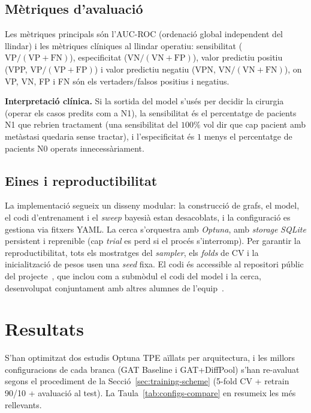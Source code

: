 \documentclass[10pt,a4paper,twocolumn,twoside]{article}
\begin{document}
\subsection{Mètriques d'avaluació}

Les mètriques principals són l'AUC-ROC (ordenació global independent del llindar) i les
mètriques clíniques al llindar operatiu: sensibilitat ($\text{VP}/(\text{VP}+\text{FN})$),
especificitat ($\text{VN}/(\text{VN}+\text{FP})$), valor predictiu positiu
(VPP, $\text{VP}/(\text{VP}+\text{FP})$) i valor predictiu negatiu
(VPN, $\text{VN}/(\text{VN}+\text{FN})$), on VP, VN, FP i FN són els vertaders/falsos positius i
negatius.

\textbf{Interpretació clínica.} Si la sortida del model s'usés per decidir la cirurgia (operar els
casos predits com a N1), la sensibilitat és el percentatge de pacients N1 que rebrien
tractament (una sensibilitat del $100\%$ vol dir que cap pacient amb metàstasi quedaria sense
tractar), i l'especificitat és $1$ menys el percentatge de pacients N0 operats
innecessàriament.

\subsection{Eines i reproductibilitat}

La implementació segueix un disseny modular: la construcció de grafs, el model, el codi
d'entrenament i el \textit{sweep} bayesià estan desacoblats, i la configuració es gestiona via
fitxers YAML. La cerca s'orquestra amb \textit{Optuna}, amb \textit{storage} \textit{SQLite}
persistent i reprenible (cap \textit{trial} es perd si el procés s'interromp). Per garantir la
reproductibilitat, tots els mostratges del \textit{sampler}, els \textit{folds} de CV i la
inicialització de pesos usen una \textit{seed} fixa. El codi és accessible al repositori públic
del projecte~\cite{morillo2026repo}, que inclou com a submòdul el codi del model i la cerca,
desenvolupat conjuntament amb altres alumnes de l'equip~\cite{morillo2026codi}.

\section{Resultats}

S'han optimitzat dos estudis Optuna TPE aïllats per arquitectura, i les millors
configuracions de cada branca (GAT Baseline i GAT+DiffPool) s'han re-avaluat segons el
procediment de la Secció~\ref{sec:training-scheme} (5-fold CV + retrain 90/10 + avaluació al
test). La Taula~\ref{tab:configs-compare} en resumeix les més rellevants.
\end{document}
